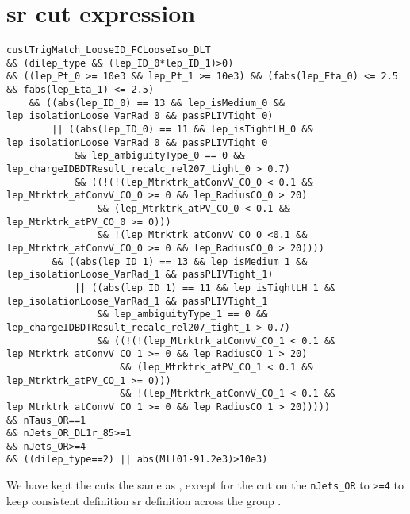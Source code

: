 \clearpage

\section{\acrshort{sr} cut expression}
\label{appendix:cut-expression}

{\fontsize{8}{10}\selectfont
    \begin{verbatim}
custTrigMatch_LooseID_FCLooseIso_DLT
&& (dilep_type && (lep_ID_0*lep_ID_1)>0)
&& ((lep_Pt_0 >= 10e3 && lep_Pt_1 >= 10e3) && (fabs(lep_Eta_0) <= 2.5 && fabs(lep_Eta_1) <= 2.5)
    && ((abs(lep_ID_0) == 13 && lep_isMedium_0 && lep_isolationLoose_VarRad_0 && passPLIVTight_0)
        || ((abs(lep_ID_0) == 11 && lep_isTightLH_0 && lep_isolationLoose_VarRad_0 && passPLIVTight_0
            && lep_ambiguityType_0 == 0 && lep_chargeIDBDTResult_recalc_rel207_tight_0 > 0.7)
            && ((!(!(lep_Mtrktrk_atConvV_CO_0 < 0.1 && lep_Mtrktrk_atConvV_CO_0 >= 0 && lep_RadiusCO_0 > 20)
                && (lep_Mtrktrk_atPV_CO_0 < 0.1 && lep_Mtrktrk_atPV_CO_0 >= 0)))
                && !(lep_Mtrktrk_atConvV_CO_0 <0.1 && lep_Mtrktrk_atConvV_CO_0 >= 0 && lep_RadiusCO_0 > 20))))
        && ((abs(lep_ID_1) == 13 && lep_isMedium_1 && lep_isolationLoose_VarRad_1 && passPLIVTight_1)
            || ((abs(lep_ID_1) == 11 && lep_isTightLH_1 && lep_isolationLoose_VarRad_1 && passPLIVTight_1
                && lep_ambiguityType_1 == 0 && lep_chargeIDBDTResult_recalc_rel207_tight_1 > 0.7)
                && ((!(!(lep_Mtrktrk_atConvV_CO_1 < 0.1 && lep_Mtrktrk_atConvV_CO_1 >= 0 && lep_RadiusCO_1 > 20)
                    && (lep_Mtrktrk_atPV_CO_1 < 0.1 && lep_Mtrktrk_atPV_CO_1 >= 0)))
                    && !(lep_Mtrktrk_atConvV_CO_1 < 0.1 && lep_Mtrktrk_atConvV_CO_1 >= 0 && lep_RadiusCO_1 > 20)))))
&& nTaus_OR==1
&& nJets_OR_DL1r_85>=1
&& nJets_OR>=4
&& ((dilep_type==2) || abs(Mll01-91.2e3)>10e3)
\end{verbatim}
}

We have kept the cuts the same as \cite{severin}, except for the cut on the \verb|nJets_OR| to \verb|>=4| to keep
consistent definition \gls{sr} definition across the group .